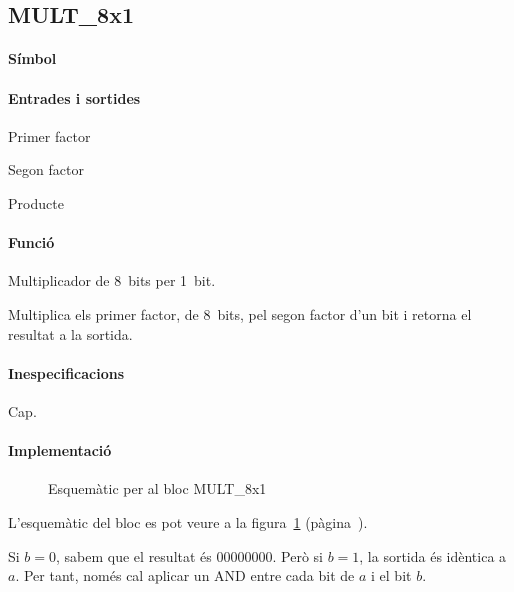 \subsection{\label{sub:\projectname-MULT_8x1} \textsf{MULT\_8x1}}

\paragraph{Símbol}
\begin{center}  \end{center}

\paragraph{Entrades i sortides}

\begin{where}
\item[\nodenamerange{a}{7}{0}] Primer factor
\item[\nodenamebit{b}] Segon factor
\item[\nodenamerange{z}{7}{0}] Producte
\end{where}

\paragraph{Funció}

Multiplicador de 8~bits per 1~bit.

Multiplica els primer factor, de 8~bits, pel segon factor d'un bit i retorna el resultat a la sortida.

\paragraph{Inespecificacions}

Cap.

\paragraph{Implementació}

\begin{figure}[b]
  \begin{center}
  \end{center}
  \caption{\label{fig:\projectname-MULT_8x1} Esquemàtic per al bloc \textsf{MULT\_8x1}}
\end{figure}

L'esquemàtic del bloc es pot veure a la figura~\ref{fig:\projectname-MULT_8x1} (pàgina~\pageref{fig:\projectname-MULT_8x1}).

Si $b = 0$, sabem que el resultat és $00000000$. Però si $b = 1$, la sortida és
idèntica a $a$. Per tant, només cal aplicar un AND entre cada bit de $a$ i el
bit $b$.

\vspace{1cm}
